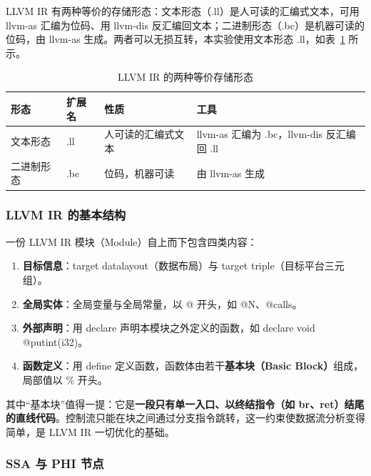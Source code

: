 \documentclass[UTF8,a4paper,10pt]{ctexart}
\newcommand{\headcol}{\bfseries}
\begin{document}
LLVM IR 有两种等价的存储形态：文本形态（.ll）是人可读的汇编式文本，可用 llvm-as 汇编为位码、用 llvm-dis 反汇编回文本；二进制形态（.bc）是机器可读的位码，由 llvm-as 生成。两者可以无损互转，本实验使用文本形态 .ll，如表~\ref{tab:llbc} 所示。

\begin{table}[H]
  \centering
  \small
  \setlength{\tabcolsep}{4pt}
  \begin{tabular}{>{\centering\arraybackslash}p{2.2cm}>{\centering\arraybackslash}p{2.0cm}>{\centering\arraybackslash}p{4.2cm}>{\centering\arraybackslash}p{5.6cm}}
    \toprule
\headcol 形态 & \headcol 扩展名 & \headcol 性质 & \headcol 工具 \\
    \midrule
文本形态 & .ll & 人可读的汇编式文本 & llvm-as 汇编为 .bc，llvm-dis 反汇编回 .ll \\
    二进制形态 & .bc & 位码，机器可读 & 由 llvm-as 生成 \\
    \bottomrule
\end{tabular}
  \caption{LLVM IR 的两种等价存储形态}
  \label{tab:llbc}
\end{table}

\subsubsection{LLVM IR 的基本结构}

一份 LLVM IR 模块（Module）自上而下包含四类内容：

\begin{enumerate}[1.]
  \item \textbf{目标信息}：target datalayout（数据布局）与 target triple（目标平台三元组）。
  \item \textbf{全局实体}：全局变量与全局常量，以 @ 开头，如 @N、@calls。
  \item \textbf{外部声明}：用 declare 声明本模块之外定义的函数，如 declare void @putint(i32)。
  \item \textbf{函数定义}：用 define 定义函数，函数体由若干\textbf{基本块（Basic Block）}组成，局部值以 \% 开头。
\end{enumerate}

其中“基本块”值得一提：它是\textbf{一段只有单一入口、以终结指令（如 br、ret）结尾的直线代码}。控制流只能在块之间通过分支指令跳转，这一约束使数据流分析变得简单，是 LLVM IR 一切优化的基础。

\subsubsection{SSA 与 PHI 节点}
\end{document}
